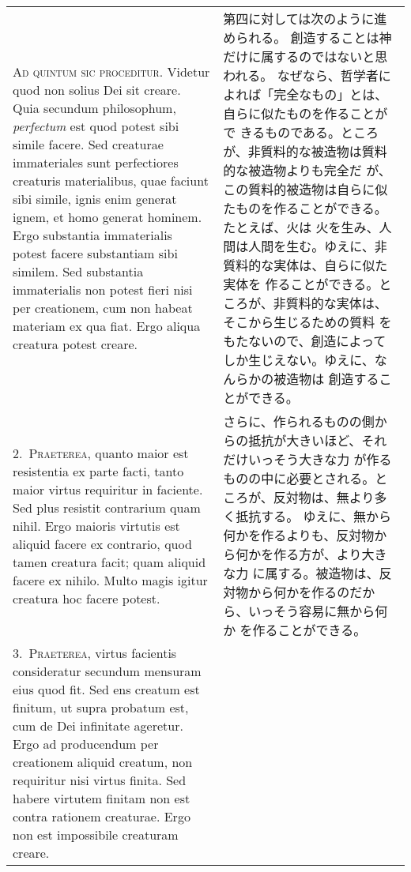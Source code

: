 \documentclass[10pt]{jsarticle} %
\begin{document}
\begin{longtable}{p{21em}p{21em}}

{\huge A}{\scshape d quintum sic proceditur}. Videtur quod non solius
 Dei sit creare. Quia secundum philosophum, {\itshape perfectum} est
 quod potest sibi simile facere. Sed creaturae immateriales sunt
 perfectiores creaturis materialibus, quae faciunt sibi simile, ignis
 enim generat ignem, et homo generat hominem. Ergo substantia
 immaterialis potest facere substantiam sibi similem. Sed substantia
 immaterialis non potest fieri nisi per creationem, cum non habeat
 materiam ex qua fiat. Ergo aliqua creatura potest creare.

&

第四に対しては次のように進められる。
創造することは神だけに属するのではないと思われる。
なぜなら、哲学者によれば「完全なもの」とは、自らに似たものを作ることがで
 きるものである。ところが、非質料的な被造物は質料的な被造物よりも完全だ
 が、この質料的被造物は自らに似たものを作ることができる。たとえば、火は
 火を生み、人間は人間を生む。ゆえに、非質料的な実体は、自らに似た実体を
 作ることができる。ところが、非質料的な実体は、そこから生じるための質料
 をもたないので、創造によってしか生じえない。ゆえに、なんらかの被造物は
 創造することができる。

\\


2.~{\scshape Praeterea}, quanto maior est resistentia ex
 parte facti, tanto maior virtus requiritur in faciente. Sed plus
 resistit contrarium quam nihil. Ergo maioris virtutis est aliquid
 facere ex contrario, quod tamen creatura facit; quam aliquid facere ex
 nihilo. Multo magis igitur creatura hoc facere potest.

&
さらに、作られるものの側からの抵抗が大きいほど、それだけいっそう大きな力
 が作るものの中に必要とされる。ところが、反対物は、無より多く抵抗する。
 ゆえに、無から何かを作るよりも、反対物から何かを作る方が、より大きな力
 に属する。被造物は、反対物から何かを作るのだから、いっそう容易に無から何か
 を作ることができる。

\\


3.~{\scshape Praeterea}, virtus facientis consideratur
 secundum mensuram eius quod fit. Sed ens creatum est finitum, ut supra
 probatum est, cum de Dei infinitate ageretur. Ergo ad producendum per
 creationem aliquid creatum, non requiritur nisi virtus finita. Sed
 habere virtutem finitam non est contra rationem creaturae. Ergo non est
 impossibile creaturam creare.


\end{longtable}
\end{document}
